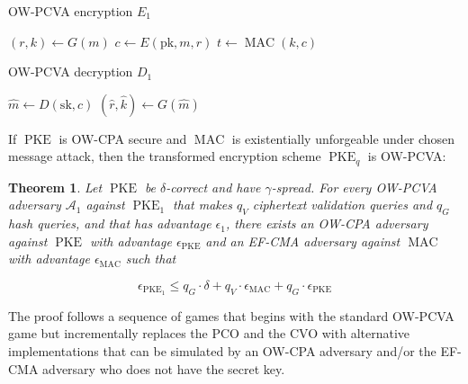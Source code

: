 \documentclass{article}
\newcommand{\pke}{\operatorname{PKE}}
\newcommand{\mac}{\operatorname{MAC}}
\newtheorem{theorem}{Theorem}[section]
\begin{document}
\begin{multicols}{2}
    \begin{algorithm}[H]
        \SetAlgoLined
        \caption{OW-PCVA encryption $E_1$}
        $(r, k) \leftarrow G(m)$\;
        $c \leftarrow E(\text{pk}, m, r)$\;
        $t \leftarrow \operatorname{MAC}(k, c)$
        \;
        \;
    \end{algorithm}

    \columnbreak

    \begin{algorithm}[H]
        \SetAlgoLined
        \caption{OW-PCVA decryption $D_1$}
        $\hat{m} \leftarrow D(\text{sk}, c)$\;
        $(\hat{r}, \hat{k}) \leftarrow G(\hat{m})$\;
        \;
    \end{algorithm}
\end{multicols}

If $\pke$ is OW-CPA secure and $\mac$ is existentially unforgeable under chosen message attack, then the transformed encryption scheme $\pke_q$ is OW-PCVA:

\begin{theorem}
    Let $\pke$ be $\delta$-correct and have $\gamma$-spread. For every OW-PCVA adversary $\mathcal{A}_1$ against $\pke_1$ that makes $q_V$ ciphertext validation queries and $q_G$ hash queries, and that has advantage $\epsilon_1$, there exists an OW-CPA adversary against $\pke$ with advantage $\epsilon_{\pke}$ and an EF-CMA adversary against $\mac$ with advantage $\epsilon_{\mac}$ such that

    \begin{equation*}
        \epsilon_{\pke_1} \leq q_G \cdot \delta + q_V \cdot \epsilon_{\mac} + q_G \cdot \epsilon_{\pke}
    \end{equation*}
\end{theorem}

The proof follows a sequence of games that begins with the standard OW-PCVA game but incrementally replaces the PCO and the CVO with alternative implementations that can be simulated by an OW-CPA adversary and/or the EF-CMA adversary who does not have the secret key.
\end{document}
